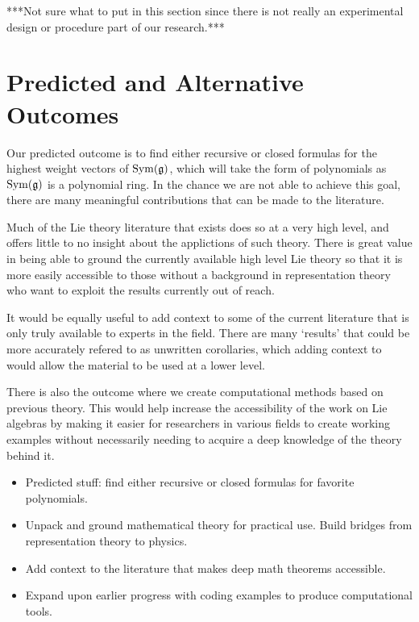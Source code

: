 \documentclass[11pt, reqno]{amsart}
\begin{document}
***Not sure what to put in this section since there is not really an experimental design or procedure part of our research.***

\section{Predicted and Alternative Outcomes}

Our predicted outcome is to find either recursive or closed formulas for the highest weight vectors of $\operatorname{Sym}(\mathfrak{g})$, which will take the form of polynomials as $\operatorname{Sym}(\mathfrak{g})$ is a polynomial ring. In the chance we are not able to achieve this goal, there are many meaningful contributions that can be made to the literature.

Much of the Lie theory literature that exists does so at a very high level, and offers little to no insight about the applictions of such theory. There is great value in being able to ground the currently available high level Lie theory so that it is more easily accessible to those without a background in representation theory who want to exploit the results currently out of reach.

It would be equally useful to add context to some of the current literature that is only truly available to experts in the field. There are many `results' that could be more accurately refered to as unwritten corollaries, which adding context to would allow the material to be used at a lower level.

There is also the outcome where we create computational methods based on previous theory. This would help increase the accessibility of the work on Lie algebras by making it easier for researchers in various fields to create working examples without necessarily needing to acquire a deep knowledge of the theory behind it.



\begin{itemize}
\item Predicted stuff: find either recursive or closed formulas for favorite polynomials.
\item Unpack and ground mathematical theory for practical use. Build bridges from representation theory to physics.
\item Add context to the literature that makes deep math theorems accessible. 
\item Expand upon earlier progress with coding examples to produce computational tools.

\end{itemize}
\end{document}
